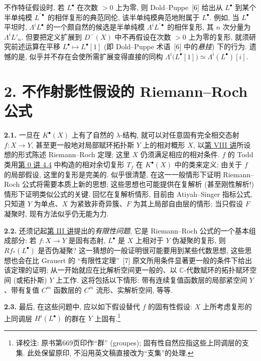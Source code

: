 不作特征假设时, 若 $L^\bullet$ 在次数 $>0$ 上为零, 则 Dold--Puppe~[6] 给出从 $L^\bullet$ 到某个半单纯模 $L^{\prime\bullet}$ 的相伴复形的典范同伦, 该半单纯模典范地附属于 $L^\bullet$. 例如, 当 $L^\bullet$ 平坦时, $\Lambda^iL^\bullet$ 的一个颇自然的候选是半单纯模 $\Lambda^iL^{\prime\bullet}$ 的相伴复形, 其 $n$ 次分量为 $\Lambda^iL'_n$. 但要把定义扩展到 $D^-(X)$ 中不再假设在次数 $>0$ 上为零的复形, 就须研究前述运算在平移 $L^\bullet\mapsto L^\bullet[1]$ (即 Dold--Puppe 术语~[6] 中的\emph{悬挂}) 下的行为. 遗憾的是, 似乎并不存在会使所需扩展变得直接的同构 $\Lambda^i\bigl(L^\bullet[1]\bigr)\simeq\Lambda^i(L^\bullet)[i]$.

\section*{2. 不作射影性假设的 Riemann--Roch 公式}

\textbf{2.1.} 一旦在 $K^\bullet(X)$ 上有了自然的 $\lambda$-结构, 就可以对任意固有完全相交态射 $f:X\to Y$, 甚至更一般地对局部赋环拓扑斯 $Y$ 上的相对概形 $X$, 以\hyperlink{sga6.e08.expose}{第 VIII 讲}所设想的形式陈述 Riemann--Roch 定理; 这里 $X$ 仍须满足相应的相对条件. $f$ 的 Todd 类用\hyperlink{sga6.e00.sec.4.4}{第 0 讲 4.4} 中构造的相对余切复形 $T_f$ 在 $K^\bullet(X)$ 中的类来定义; 由关于 $f$ 的局部假设, 这里的复形是完美的. 似乎很清楚, 在这一一般情形下证明 Riemann--Roch 公式将需要本质上新的思想; 这些思想也可能提供在复解析 (甚至刚性解析!) 情形下证明类似公式的关键. 回忆在复解析情形, 目前由 Atiyah--Singer 指标公式, 只知道 $Y$ 为单点、$X$ 为紧致非奇异簇、$F$ 为其上局部自由层的情形; 当只假设 $F$ 凝聚时, 现有方法似乎仍无能为力.

\textbf{2.2.} 还须记起\hyperlink{sga6.e03.expose}{第 III 讲}提出的\emph{有限性问题}, 它是 Riemann--Roch 公式的一个基本组成部分: 若 $f:X\to Y$ 是固有态射, $L^\bullet$ 是 $X$ 上相对于 $Y$ 伪凝聚的复形, 则 $Rf_*(L^\bullet)$ 是否伪凝聚? 这一猜想的一般证明很可能要用到某些代数思想, 这些思想也会在比 Grauert 的 ``有限性定理''~[7] 原文所用条件显著更一般的条件下给出该定理的证明; 从一开始就应在比解析空间更一般的、以 $\mathbb C$-代数赋环的拓扑赋环空间 (或拓扑斯) $Y$ 上工作. 这将包括以下情形: 带有连续复值函数层的局部紧空间 $Y$、带有复值 $C^m$ 函数层的 $C^m$ 流形、实解析空间, 等等.

\textbf{2.3.} 最后, 在这些问题中, 应以如下假设替代 $f$ 的固有性假设: $X$ 上所考虑复形的上同调层 $H^i(L^\bullet)$ 的群在 $Y$ 上固有.\footnote{译校注: 原书第669页印作“群” (groupes); 固有性自然应指这些上同调层的支集. 此处保留原印, 不沿用英文稿直接改为“支集”的处理.}

